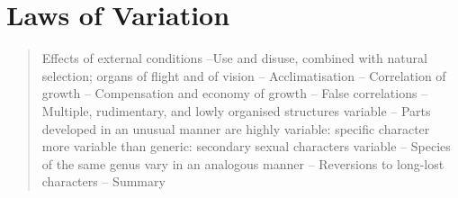 \chapter{Laws of Variation}

\begin{quotation}
Effects of external conditions --Use and disuse, combined with natural selection; organs of flight and of vision -- Acclimatisation -- Correlation of growth -- Compensation and economy of growth -- False correlations -- Multiple, rudimentary, and lowly organised structures variable -- Parts developed in an unusual manner are highly variable: specific character more variable than generic: secondary sexual characters variable -- Species of the same genus vary in an analogous manner -- Reversions to long-lost characters -- Summary
\end{quotation}


